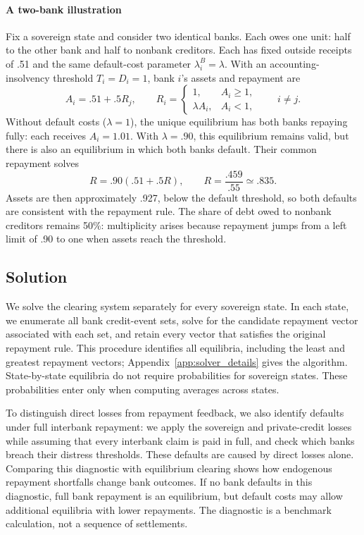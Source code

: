 \paragraph{A two-bank illustration}
Fix a sovereign state and consider two identical banks. Each owes one unit: half to the other bank and half to nonbank creditors. Each has fixed outside receipts of .51 and the same default-cost parameter $\lambda_i^B=\lambda$. With an accounting-insolvency threshold $T_i=D_i=1$, bank $i$'s assets and repayment are
\[
 A_i=.51+.5R_j,\qquad
 R_i=\begin{cases}1,&A_i\geq1,\\
 \lambda A_i,&A_i<1,\end{cases}\qquad i\ne j.
\]
Without default costs ($\lambda=1$), the unique equilibrium has both banks repaying fully: each receives $A_i=1.01$. With $\lambda=.90$, this equilibrium remains valid, but there is also an equilibrium in which both banks default. Their common repayment solves
\[
 R=.90(.51+.5R),\qquad
 R=\frac{.459}{.55}\simeq.835.
\]
Assets are then approximately .927, below the default threshold, so both defaults are consistent with the repayment rule. The share of debt owed to nonbank creditors remains 50\%: multiplicity arises because repayment jumps from a left limit of .90 to one when assets reach the threshold.

\subsection{Solution}

We solve the clearing system separately for every sovereign state. In each state, we enumerate all bank credit-event sets, solve for the candidate repayment vector associated with each set, and retain every vector that satisfies the original repayment rule. This procedure identifies all equilibria, including the least and greatest repayment vectors; Appendix~\ref{app:solver_details} gives the algorithm. State-by-state equilibria do not require probabilities for sovereign states. These probabilities enter only when computing averages across states.

To distinguish direct losses from repayment feedback, we also identify defaults under full interbank repayment: we apply the sovereign and private-credit losses while assuming that every interbank claim is paid in full, and check which banks breach their distress thresholds. These defaults are caused by direct losses alone. Comparing this diagnostic with equilibrium clearing shows how endogenous repayment shortfalls change bank outcomes. If no bank defaults in this diagnostic, full bank repayment is an equilibrium, but default costs may allow additional equilibria with lower repayments. The diagnostic is a benchmark calculation, not a sequence of settlements.

